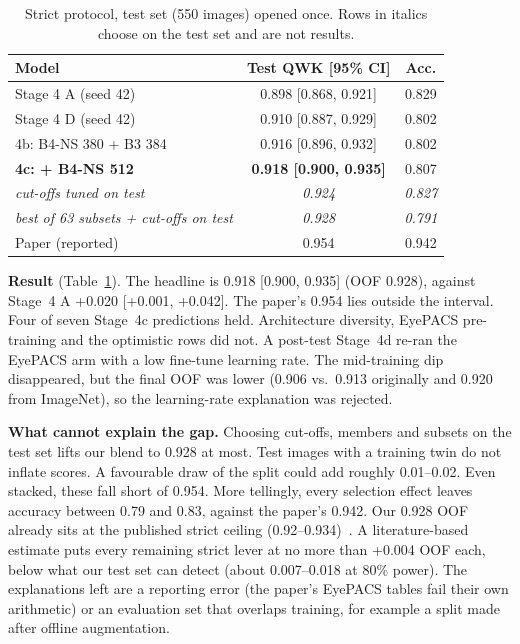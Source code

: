 \documentclass[conference]{IEEEtran}
\begin{document}
\begin{table}[t]
\centering
\caption{Strict protocol, test set (550 images) opened once. Rows in italics choose on the test set and are not
results.}
\label{tab:strict}
\small
\setlength{\tabcolsep}{3pt}
\begin{tabular}{@{}lcc@{}}
\toprule
Model & Test QWK [95\% CI] & Acc. \\
\midrule
Stage 4 A (seed 42) & 0.898 [0.868, 0.921] & 0.829 \\
Stage 4 D (seed 42) & 0.910 [0.887, 0.929] & 0.802 \\
4b: B4-NS 380 + B3 384 & 0.916 [0.896, 0.932] & 0.802 \\
\textbf{4c: + B4-NS 512} & \textbf{0.918 [0.900, 0.935]} & 0.807 \\
\textit{cut-offs tuned on test} & \textit{0.924} & \textit{0.827} \\
\textit{best of 63 subsets + cut-offs on test} & \textit{0.928} & \textit{0.791} \\
Paper (reported) & 0.954 & 0.942 \\
\bottomrule
\end{tabular}
\end{table}

\textbf{Result} (Table~\ref{tab:strict}). The headline is 0.918 [0.900, 0.935] (OOF 0.928), against Stage~4 A
+0.020 [+0.001, +0.042]. The paper's 0.954 lies outside the interval. Four of seven Stage~4c predictions held.
Architecture diversity, EyePACS pre-training and the optimistic rows did not. A post-test Stage~4d re-ran the EyePACS
arm with a low fine-tune learning rate. The mid-training dip disappeared, but the final OOF was lower (0.906 vs.\
0.913 originally and 0.920 from ImageNet), so the learning-rate explanation was rejected.

\textbf{What cannot explain the gap.} Choosing cut-offs, members and subsets on the test set lifts our blend to
0.928 at most. Test images with a training twin do not inflate scores. A favourable draw of the split could add
roughly 0.01--0.02. Even stacked, these fall short of 0.954. More tellingly, every selection effect leaves accuracy
between 0.79 and 0.83, against the paper's 0.942. Our 0.928 OOF already sits at the published strict ceiling
(0.92--0.934)~\cite{fang2023imagenet,zhu2023nnmobilenet,huang2022ssit}. A literature-based estimate puts every
remaining strict lever at no more than +0.004 OOF each, below what our test set can detect (about 0.007--0.018 at
80\% power). The explanations left are a reporting error (the paper's EyePACS tables fail their own arithmetic) or an
evaluation set that overlaps training, for example a split made after offline augmentation.
\end{document}
